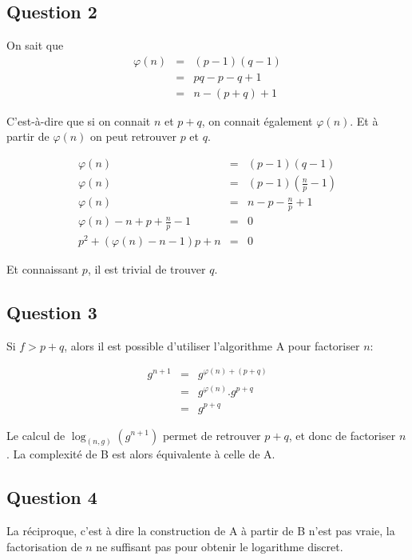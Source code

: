 \documentclass[a4paper,10pt,twocolumn]{article}
\theoremstyle{break}
\begin{document}
\subsection{Question 2}
On sait que 
\begin{eqnarray*}
 \varphi(n) & = & (p-1)(q-1) \\
 & = & pq -p -q +1 \\
 & = & n -(p+q) +1 
\end{eqnarray*}

C'est-à-dire que si on connait $n$ et $p+q$, on connait également $\varphi(n)$.
Et à partir de $\varphi(n)$ on peut retrouver $p$ et $q$.

\begin{eqnarray*}
 \varphi(n) & = & (p-1)(q-1) \\
 \varphi(n) & = & (p-1)(\frac{n}{p}-1) \\
 \varphi(n) & = & n - p - \frac{n}{p} + 1 \\
 \varphi(n) - n + p + \frac{n}{p} - 1 & = & 0 \\
 p^2 + (\varphi(n) - n - 1)p + n & = & 0
\end{eqnarray*}

Et connaissant $p$, il est trivial de trouver $q$.

\subsection{Question 3}

Si $f > p + q$, alors il est possible d'utiliser l'algorithme A pour factoriser $n$:

\begin{eqnarray*}
g^{n + 1} & = & g^{\varphi(n) + (p+q)} \\
& = & g^{\varphi(n)} . g^{p+q} \\
& = & g^{p+q}
\end{eqnarray*}

Le calcul de $\log_{(n,g)}(g^{n+1})$ permet de retrouver $p + q$, et donc de factoriser $n$. La complexité de B est alors équivalente à celle de A.

\subsection{Question 4}

La réciproque, c'est à dire la construction de A à partir de B n'est pas vraie, la factorisation de $n$ ne suffisant pas pour obtenir le logarithme discret.
\end{document}
